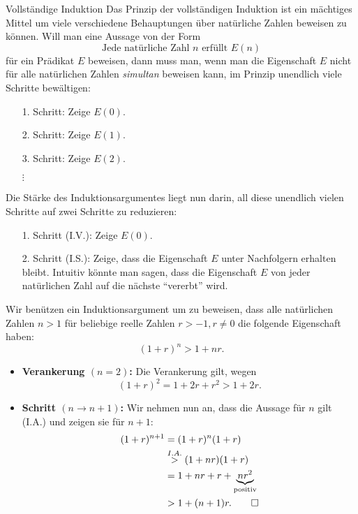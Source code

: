 \begin{howto}{Vollständige Induktion}
Das Prinzip der vollständigen Induktion ist ein mächtiges Mittel um viele verschiedene Behauptungen über natürliche Zahlen beweisen zu können. Will man eine Aussage von der Form
\[
\text{Jede natürliche Zahl }n\text{ erfüllt }E(n)
\]
für ein Prädikat $E$ beweisen, dann muss man, wenn man die Eigenschaft $E$ nicht für alle natürlichen Zahlen \textit{simultan} beweisen kann, im Prinzip unendlich viele Schritte bewältigen:
\begin{enumerate}
\item[1.] Schritt: Zeige $E(0)$.
\item[2.] Schritt: Zeige $E(1)$.
\item[3.] Schritt: Zeige $E(2)$.
\item[$\vdots$]
\end{enumerate}
Die Stärke des Induktionsargumentes liegt nun  darin, all diese unendlich vielen Schritte auf zwei Schritte zu reduzieren:
\begin{enumerate}
\item[1.] Schritt (I.V.): Zeige $E(0)$.
\item[2.] Schritt (I.S.): Zeige, dass die Eigenschaft $E$ unter Nachfolgern erhalten bleibt. Intuitiv könnte man sagen, dass die Eigenschaft $E$ von jeder natürlichen Zahl auf die nächste ``vererbt'' wird.
\end{enumerate}
\end{howto}


\begin{example}
Wir benützen ein Induktionsargument um zu beweisen, dass alle natürlichen Zahlen $n>1$ für beliebige reelle Zahlen $r>-1, r\neq 0$ die folgende Eigenschaft haben:
\[
 (1+r)^n>1+nr.
\]
\tcblower
\begin{itemize}
\item \textbf{Verankerung $(n=2)$:} Die Verankerung gilt, wegen
\[
(1+r)^2=1+2r+r^2>1+2r.
\]
\item \textbf{Schritt $(n\to n+1)$:} Wir nehmen nun an, dass die Aussage für $n$ gilt (I.A.) und zeigen sie für $n+1$:
\begin{align*}
(1+r)^{n+1}&=(1+r)^n(1+r)\\
&\stackrel{I.A.}{>}(1+nr)(1+r)\\
&=1+nr+r+\underbrace{nr^2}_{\text{positiv}}\\
&>1+(n+1)r.\qedhere
\end{align*}
\end{itemize}
\end{example}

